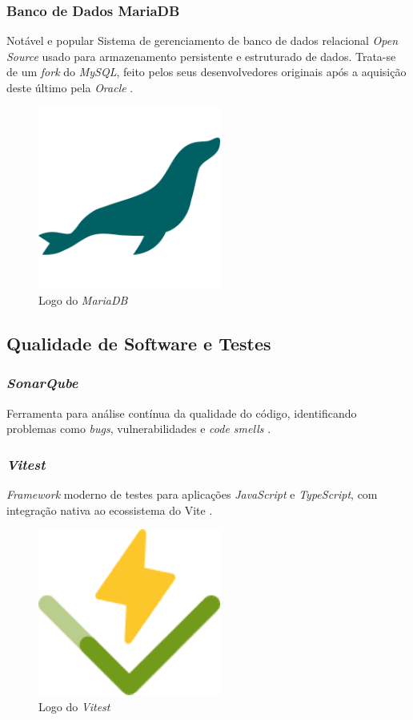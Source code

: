 \subsubsection{Banco de Dados MariaDB}
Notável e popular Sistema de gerenciamento de banco de dados relacional \emph{Open Source} usado para armazenamento persistente e estruturado de dados. Trata-se de um \emph{fork} do \emph{MySQL}, feito pelos seus desenvolvedores originais após a aquisição deste último pela \emph{Oracle} \cite{mariadb}.

\begin{figure}[htb]
	\centering
	\includegraphics[width=6cm]{cap04-desenvolvimento/images/4-4-3-3-mariadb-logo.png}
	\caption{Logo do \emph{MariaDB}}
	\label{fig:mariadb-logo}
\end{figure}

\subsection{Qualidade de Software e Testes} 

\subsubsection{\emph{SonarQube}} 
Ferramenta para análise contínua da qualidade do código, identificando problemas como \emph{bugs}, vulnerabilidades e \emph{code smells} \cite{sonarqube}.

\subsubsection{\emph{Vitest}}
\emph{Framework} moderno de testes para aplicações \emph{JavaScript} e \emph{TypeScript}, com integração nativa ao ecossistema do Vite \cite{vitest-2025}.

\begin{figure}[htb]
	\centering
	\includegraphics[width=6cm]{cap04-desenvolvimento/images/4-4-4-2-vitest-logo.png}
	\caption{Logo do \emph{Vitest}}
	\label{fig:vitest-logo}
\end{figure}
